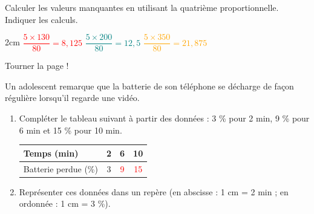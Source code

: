 \documentclass[a4paper]{book}
\begin{document}
{\begin{exercice}
\begin{enumerate}
            \vspace{1cm}
            
            Calculer les valeurs manquantes en utilisant la quatrième proportionnelle. Indiquer les calculs.

            \begin{ZoneReponse}{2cm}
                \textcolor{red}{$\dfrac{5\times130}{80}=8,125$} \quad \quad
                \textcolor{teal}{$\dfrac{5\times200}{80}=12,5$} \quad \quad
                \textcolor{orange}{$\dfrac{5\times350}{80}=21,875$}    
            \end{ZoneReponse}
        \end{enumerate}
    \end{exercice}


\vfill\hfill Tourner la page !

    \begin{exercice}
        Un adolescent remarque que la batterie de son téléphone se décharge de façon régulière lorsqu'il regarde une vidéo.

        \begin{enumerate}
            \item Compléter le tableau suivant à partir des données : 3 \% pour 2 min, 9 \% pour 6 min et 15 \% pour 10 min.
            
            \begin{center}
            \begin{tabular}{|l|c|c|c|}
            \hline
            Temps (min) & 2 & 6 & 10 \\ \hline
            Batterie perdue (\%) & 3 & \textcolor{red}{9} & \textcolor{red}{15} \\ \hline
            \end{tabular}
            \end{center}
        
            \item Représenter ces données dans un repère (en abscisse : 1 cm = 2 min ; en ordonnée : 1 cm = 3 \%).

            \begin{center}
\end{center}
\end{enumerate}
\end{exercice}}
\end{document}
